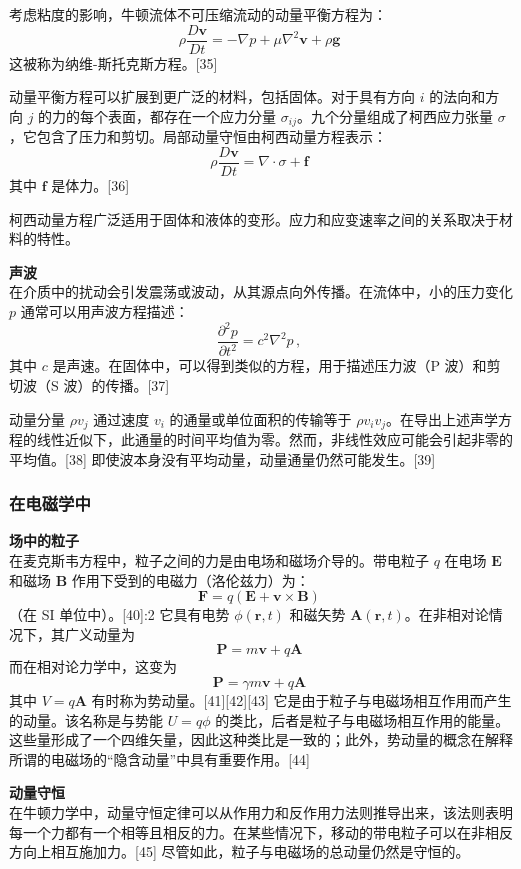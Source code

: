 考虑粘度的影响，牛顿流体不可压缩流动的动量平衡方程为：
\[
\rho \frac{D\mathbf{v}}{Dt} = -\nabla p + \mu \nabla^2 \mathbf{v} + \rho \mathbf{g}~
\]
这被称为纳维-斯托克斯方程。[35]

动量平衡方程可以扩展到更广泛的材料，包括固体。对于具有方向 \(i\) 的法向和方向 \(j\) 的力的每个表面，都存在一个应力分量 \(\sigma_{ij}\)。九个分量组成了柯西应力张量 \(\sigma\)，它包含了压力和剪切。局部动量守恒由柯西动量方程表示：
\[
\rho \frac{D\mathbf{v}}{Dt} = \nabla \cdot \sigma + \mathbf{f}~
\]
其中 \(\mathbf{f}\) 是体力。[36]

柯西动量方程广泛适用于固体和液体的变形。应力和应变速率之间的关系取决于材料的特性。

\textbf{声波}  \\
在介质中的扰动会引发震荡或波动，从其源点向外传播。在流体中，小的压力变化 \( p \) 通常可以用声波方程描述：
\[
\frac{\partial^2 p}{\partial t^2} = c^2 \nabla^2 p \,,~
\]
其中 \( c \) 是声速。在固体中，可以得到类似的方程，用于描述压力波（P 波）和剪切波（S 波）的传播。[37]

动量分量 \( \rho v_j \) 通过速度 \( v_i \) 的通量或单位面积的传输等于 \( \rho v_i v_j \)。在导出上述声学方程的线性近似下，此通量的时间平均值为零。然而，非线性效应可能会引起非零的平均值。[38] 即使波本身没有平均动量，动量通量仍然可能发生。[39]
\subsubsection{在电磁学中}  
\textbf{场中的粒子}\\  
在麦克斯韦方程中，粒子之间的力是由电场和磁场介导的。带电粒子 \( q \) 在电场 \( \mathbf{E} \) 和磁场 \( \mathbf{B} \) 作用下受到的电磁力（洛伦兹力）为：
\[
\mathbf{F} = q (\mathbf{E} + \mathbf{v} \times \mathbf{B})~
\]
（在 SI 单位中）。[40]:2 它具有电势 \( \phi(\mathbf{r}, t) \) 和磁矢势 \( \mathbf{A}(\mathbf{r}, t) \)。在非相对论情况下，其广义动量为
\[
\mathbf{P} = m \mathbf{v} + q \mathbf{A}~
\]
而在相对论力学中，这变为
\[
\mathbf{P} = \gamma m \mathbf{v} + q \mathbf{A}~
\]
其中 \( V = q \mathbf{A} \) 有时称为势动量。[41][42][43] 它是由于粒子与电磁场相互作用而产生的动量。该名称是与势能 \( U = q \phi \) 的类比，后者是粒子与电磁场相互作用的能量。这些量形成了一个四维矢量，因此这种类比是一致的；此外，势动量的概念在解释所谓的电磁场的“隐含动量”中具有重要作用。[44] 

\textbf{动量守恒}\\
在牛顿力学中，动量守恒定律可以从作用力和反作用力法则推导出来，该法则表明每一个力都有一个相等且相反的力。在某些情况下，移动的带电粒子可以在非相反方向上相互施加力。[45] 尽管如此，粒子与电磁场的总动量仍然是守恒的。

